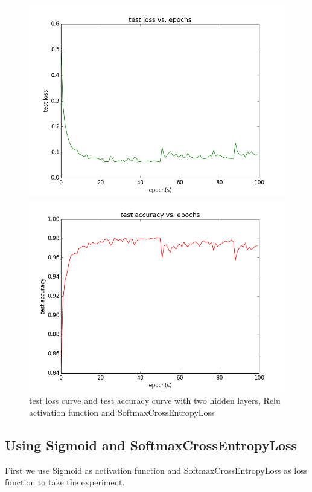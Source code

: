 \documentclass{elegantbook}
\begin{document}
\begin{figure}[!ht]
	\centering
	\begin{minipage}[t]{0.45\textwidth}
		\centering
		\includegraphics[width=\textwidth]{testloss2rs}
	\end{minipage}
	\begin{minipage}[t]{0.45\textwidth}
		\centering
		\includegraphics[width=\textwidth]{testacc2rs}
	\end{minipage}
	\caption{\label{testcurve23}test loss curve and test accuracy curve with two hidden layers, Relu activation function and SoftmaxCrossEntropyLoss}
\end{figure}

\subsection{Using Sigmoid and SoftmaxCrossEntropyLoss}
First we use Sigmoid as activation function and SoftmaxCrossEntropyLoss as loss function to take the experiment.
\end{document}
